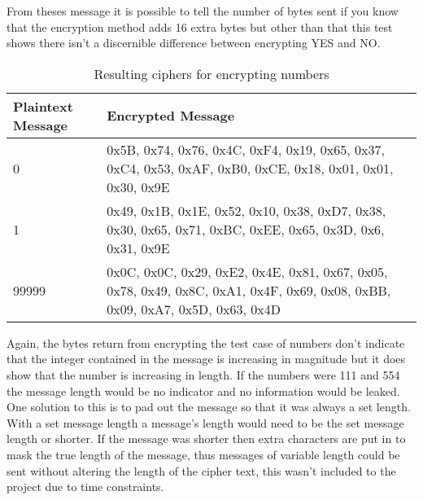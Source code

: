 From theses message it is possible to tell the number of bytes sent if you know that the encryption method adds 16 extra bytes but other than that this test shows there isn't a discernible difference between encrypting YES and NO.

\begin{table}[H]
	\centering
	\begin{tabular}{ | l | p{7cm} | }
	\hline
	Plaintext Message & Encrypted Message \\ \hline
	0 & 0x5B, 0x74, 0x76, 0x4C, 0xF4, 0x19, 0x65, 0x37, 0xC4, 0x53, 0xAF, 0xB0, 0xCE, 0x18, 0x01, 0x01, 0x30, 0x9E \\ \hline
	1 & 0x49, 0x1B, 0x1E, 0x52, 0x10, 0x38, 0xD7, 0x38, 0x30, 0x65, 0x71, 0xBC, 0xEE, 0x65, 0x3D, 0x6, 0x31, 0x9E\\ \hline
	99999 & 0x0C, 0x0C, 0x29, 0xE2, 0x4E, 0x81, 0x67, 0x05, 0x78, 0x49, 0x8C, 0xA1, 0x4F, 0x69, 0x08, 0xBB, 0x09, 0xA7, 0x5D, 0x63, 0x4D \\ \hline
	\end{tabular}
	\caption{Resulting ciphers for encrypting numbers}
	\label{tab:9999}
\end{table}

Again, the bytes return from encrypting the test case of numbers don't indicate that the integer contained in the message is increasing in magnitude but it does show that the number is increasing in length. If the numbers were 111 and 554 the message length would be no indicator and no information would be leaked. One solution to this is to pad out the message so that it was always a set length. With a set message length a message's length would need to be the set message length or shorter. If the message was shorter then extra characters are put in to mask the true length of the message, thus messages of variable length could be sent without altering the length of the cipher text, this wasn't included to the project due to time constraints.  



